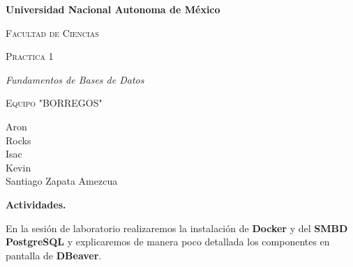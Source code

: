 \documentclass[12pt]{report}
\begin{document}
\begin{titlepage}
\centering
{\bfseries\LARGE Universidad Nacional Autonoma de M\'exico \par}
\vspace{1cm}
{\scshape\Large Facultad de Ciencias \par}
\vspace{3cm}
{\scshape\Huge Practica 1  \par}
\vspace{3cm}
{\itshape\Large Fundamentos de Bases de Datos \par}
\vfill
{\scshape\Huge Equipo "BORREGOS"  \par}
\vspace{3cm}
{\Large Aron\\ Rocks\\ Isac\\ Kevin\\ Santiago Zapata Amezcua \par}
\vfill
\end{titlepage}
\clearpage

\setcounter{page}{1}

{\LARGE\bfseries\textcolor{azul}{Actividades.}}\par\vspace{0.5em}

En la sesión de laboratorio realizaremos la instalación de \textbf{Docker} y del \textbf{SMBD PostgreSQL} y explicaremos de manera poco detallada los componentes en pantalla de \textbf{DBeaver}.

\bigskip
\end{document}
